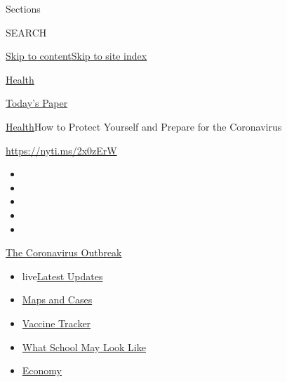 Sections

SEARCH

\protect\hyperlink{site-content}{Skip to
content}\protect\hyperlink{site-index}{Skip to site index}

\href{https://www.nytimes.com/section/health}{Health}

\href{https://myaccount.nytimes.com/auth/login?response_type=cookie\&client_id=vi}{}

\href{https://www.nytimes.com/section/todayspaper}{Today's Paper}

\href{/section/health}{Health}\textbar{}How to Protect Yourself and
Prepare for the Coronavirus

\url{https://nyti.ms/2x0zErW}

\begin{itemize}
\item
\item
\item
\item
\item
\end{itemize}

\href{https://www.nytimes.com/news-event/coronavirus?action=click\&pgtype=Article\&state=default\&region=TOP_BANNER\&context=storylines_menu}{The
Coronavirus Outbreak}

\begin{itemize}
\tightlist
\item
  live\href{https://www.nytimes.com/2020/08/01/world/coronavirus-covid-19.html?action=click\&pgtype=Article\&state=default\&region=TOP_BANNER\&context=storylines_menu}{Latest
  Updates}
\item
  \href{https://www.nytimes.com/interactive/2020/us/coronavirus-us-cases.html?action=click\&pgtype=Article\&state=default\&region=TOP_BANNER\&context=storylines_menu}{Maps
  and Cases}
\item
  \href{https://www.nytimes.com/interactive/2020/science/coronavirus-vaccine-tracker.html?action=click\&pgtype=Article\&state=default\&region=TOP_BANNER\&context=storylines_menu}{Vaccine
  Tracker}
\item
  \href{https://www.nytimes.com/interactive/2020/07/29/us/schools-reopening-coronavirus.html?action=click\&pgtype=Article\&state=default\&region=TOP_BANNER\&context=storylines_menu}{What
  School May Look Like}
\item
  \href{https://www.nytimes.com/live/2020/07/31/business/stock-market-today-coronavirus?action=click\&pgtype=Article\&state=default\&region=TOP_BANNER\&context=storylines_menu}{Economy}
\end{itemize}

